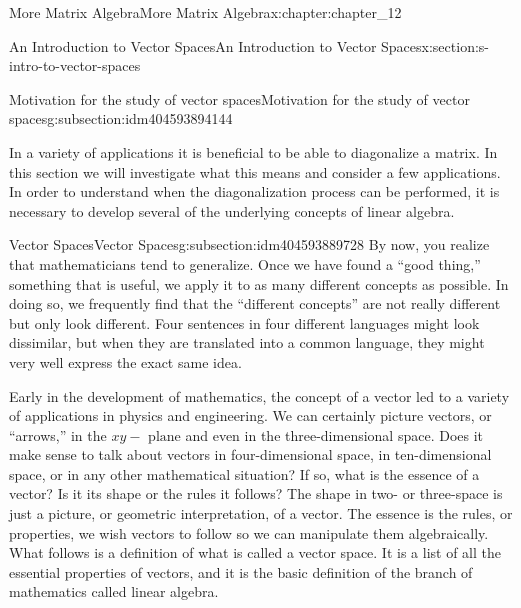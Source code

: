 \documentclass[twoside,10pt,]{book}
\numberwithin{equation}{section}
\renewcommand{\vec}[1]{\mathbf{#1}}
\begin{document}
\begin{chapterptx}{More Matrix Algebra}{}{More Matrix Algebra}{}{}{x:chapter:chapter_12}
\begin{sectionptx}{An Introduction to Vector Spaces}{}{An Introduction to Vector Spaces}{}{}{x:section:s-intro-to-vector-spaces}
\begin{subsectionptx}{Motivation for the study of vector spaces}{}{Motivation for the study of vector spaces}{}{}{g:subsection:idm404593894144}
\par
In a variety of applications it is beneficial to be able to diagonalize a matrix. In this section we will investigate what this means and consider a few applications. In order to understand when the diagonalization process can be performed, it is necessary to develop several of the underlying concepts of linear algebra.%
\end{subsectionptx}
%
%
\typeout{************************************************}
\typeout{************************************************}
%
\begin{subsectionptx}{Vector Spaces}{}{Vector Spaces}{}{}{g:subsection:idm404593889728}
By now, you realize that mathematicians tend to generalize. Once we have found a ``good thing,'' something that is useful, we apply it to as many different concepts as possible. In doing so, we frequently find that the ``different concepts'' are not really different but only look different. Four sentences in four different languages might look dissimilar, but when they are translated into a common language, they might very well express the exact same idea.%
\par
Early in the development of mathematics, the concept of a vector led to a variety of applications in physics and engineering. We can certainly picture vectors, or ``arrows,'' in the \(x y-\textrm{ plane}\) and even in the three-dimensional space. Does it make sense to talk about vectors in four-dimensional space, in ten-dimensional space, or in any other mathematical situation? If so, what is the essence of a vector? Is it its shape or  the rules it follows? The shape in two- or three-space is just a picture, or geometric interpretation, of a vector. The essence is the rules, or properties, we wish vectors to follow so we can manipulate them algebraically. What follows is a definition of what is called a vector space. It is a list of all the essential properties of vectors, and it is the basic definition of the branch of mathematics  called linear algebra.%
\end{subsectionptx}
\end{sectionptx}
\end{chapterptx}
\end{document}
